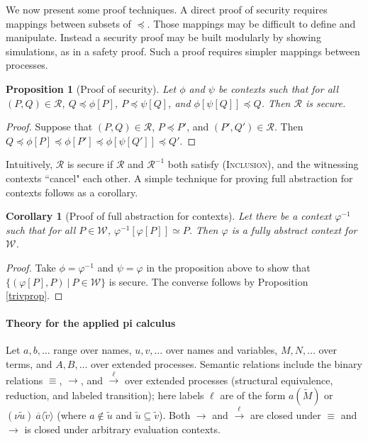 \documentclass[10pt]{article}
\newtheorem{corollary}[theorem]{Corollary}
\newtheorem{proposition}[theorem]{Proposition}
\newcommand{\tup}[1]{\langle #1\rangle}
\newcommand{\new}[2]{(\nu #1)\:#2}
\newcommand{\action}[1]{\stackrel{#1}{\longrightarrow}}
\newcommand{\seq}{\widetilde}
\begin{document}
We now present some proof techniques. A direct proof of security requires mappings between subsets of $\preceq$. Those mappings may be difficult to define and manipulate. Instead a security proof may be built modularly by showing simulations, as in a safety proof. Such a proof requires simpler mappings between processes. \begin{proposition}[Proof of security]\label{pf-fullabs}
Let $\phi$ and $\psi$ be contexts such that for all $(P,Q) \in \mathcal R$, 
	${Q \preceq \phi[P]}$,
	${P \preceq \psi[Q]}$, and
	${\phi[\psi[Q]] \preceq Q}$.
Then $\mathcal R$ is secure. 
\end{proposition}
\begin{proof} Suppose that $(P,Q) \in \mathcal R$, $P \preceq P'$, and $(P',Q') \in \mathcal R$. Then
$Q \preceq \phi[P]  \preceq \phi[P'] \preceq \phi[\psi[Q']] \preceq Q'$. 
\end{proof}
\noindent
Intuitively, $\mathcal R$ is secure if $\mathcal R$ and $\mathcal R^{-1}$ both satisfy \textsc{(Inclusion)}, and the witnessing contexts ``cancel" each other. A simple technique for proving full abstraction for contexts follows as a corollary. 
\begin{corollary}[Proof of full abstraction for contexts]\label{pf-pres} Let there be a context $\varphi^{-1}$ such that for all 
$P \in \mathcal W$,
	$\varphi^{-1}[\varphi[P]] \simeq P$. 
Then $\varphi$ is a fully abstract context for $\mathcal W$.
\end{corollary}
\begin{proof} Take $\phi = \varphi^{-1}$ and $\psi = \varphi$ in the proposition above to show that $\{(\varphi[P],P)~|~P \in \mathcal W\}$ is secure. The converse follows by Proposition \ref{trivprop}.
\end{proof}


\paragraph{Theory for the applied pi calculus}

Let $a,b,\dots$ range over names, $u,v,\dots$ over names and variables, $M,N,\dots$ over terms, and $A,B,\dots$ over extended processes. Semantic relations include the binary relations $\equiv$, $\rightarrow$, and $\action\ell$ over extended processes (structural equivalence, reduction, and labeled transition); here labels $\ell$ are of the form $a(\seq M)$ or $\new{\seq u}\overline a\tup{\seq v}$ (where $a \notin \seq u$ and $\seq u \subseteq \seq v$). Both $\rightarrow$ and $\action\ell$ are closed under $\equiv$ and $\rightarrow$ is closed under arbitrary evaluation contexts. 
\end{document}
